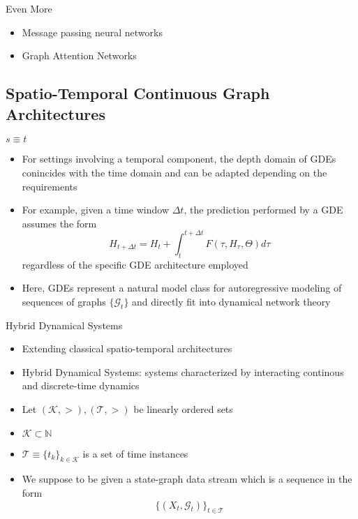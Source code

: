 \documentclass{beamer}
\begin{document}
\begin{frame}{Even More}
\begin{itemize}
\item Message passing neural networks
\item Graph Attention Networks
\end{itemize}
\end{frame}

\subsection{Spatio-Temporal Continuous Graph Architectures}
\begin{frame}{$s\equiv t$}
\begin{itemize}
\item For settings involving a temporal component, the depth domain of GDEs conincides with the time domain and can be adapted depending on the requirements
\item For example, given a time window $\Delta t$, the prediction performed by a GDE assumes the form\[
H_{t+\Delta t}=H_t+\int_t^{t+\Delta t}F(\tau,H_\tau,\Theta)d\tau
\]regardless of the specific GDE architecture employed
\item Here, GDEs represent a natural model class for autoregressive modeling of sequences of graphs $\{\mathcal G_t\}$ and directly fit into dynamical network theory
\end{itemize}
\end{frame}

\begin{frame}{Hybrid Dynamical Systems}
\begin{itemize}
\item Extending classical spatio-temporal architectures
\item Hybrid Dynamical Systems: systems characterized by interacting continous and discrete-time dynamics
\item Let $(\mathcal{K},>), (\mathcal{T},>)$ be linearly ordered sets
\item $\mathcal{K}\subset\mathbb{N}$
\item $\mathcal{T}\equiv\{t_k\}_{k\in\mathcal K}$ is a set of time instances
\item We suppose to be given a state-graph data stream which is a sequence in the form\[
\{(X_t,\mathcal{G}_t)\}_{t\in\mathcal{T}}
\]
\end{itemize}
\end{frame}
\end{document}
